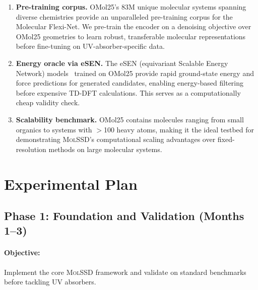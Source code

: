 \documentclass[11pt,a4paper]{article}
\newcommand{\molssd}{\textsc{MolSSD}}
\begin{document}
\begin{enumerate}[leftmargin=*]
  \item \textbf{Pre-training corpus.} OMol25's 83M unique molecular systems spanning
    diverse chemistries provide an unparalleled pre-training corpus for the Molecular
    Flexi-Net. We pre-train the encoder on a denoising objective over OMol25 geometries
    to learn robust, transferable molecular representations before fine-tuning on
    UV-absorber-specific data.

  \item \textbf{Energy oracle via eSEN.} The eSEN (equivariant Scalable Energy Network)
    models~\citep{fairchem2024} trained on OMol25 provide rapid ground-state energy and
    force predictions for generated candidates, enabling energy-based filtering before
    expensive TD-DFT calculations. This serves as a computationally cheap validity check.

  \item \textbf{Scalability benchmark.} OMol25 contains molecules ranging from small
    organics to systems with $>$100 heavy atoms, making it the ideal testbed for
    demonstrating \molssd{}'s computational scaling advantages over fixed-resolution
    methods on large molecular systems.
\end{enumerate}


\section{Experimental Plan}

\subsection{Phase 1: Foundation and Validation (Months 1--3)}

\paragraph{Objective:} Implement the core \molssd{} framework and validate on standard
benchmarks before tackling UV absorbers.
\end{document}
